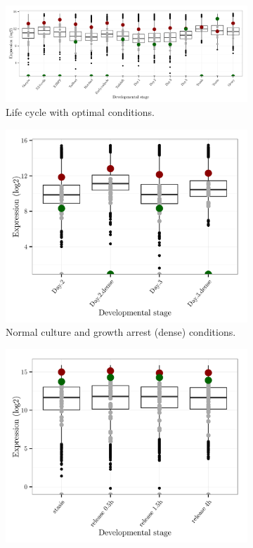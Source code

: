 \documentclass[11pt,twoside,a4paper]{report}
\begin{document}
	\begin{figure}
		\centering
		\begin{subfigure}{1\textwidth}
			\centering
			\includegraphics[width=1\textwidth]{pngs/Dot1_expression_allgenes_SETs.png}
			\caption{Life cycle with optimal conditions.}
		\end{subfigure}	
		\begin{subfigure}{.5\textwidth}
			\centering
			\includegraphics[width=1\linewidth]{pngs/Dot1_expression_allgenes_SETs_dense_noDay4.png}
			\caption{Normal culture and growth arrest (dense) conditions.}
		\end{subfigure}%
		\begin{subfigure}{.5\textwidth}
			\centering
			\includegraphics[width=1\linewidth]{pngs/stasisRelease_Dot1_expression_allgenes_SETs.png}

\end{subfigure}
\end{figure}
\end{document}
